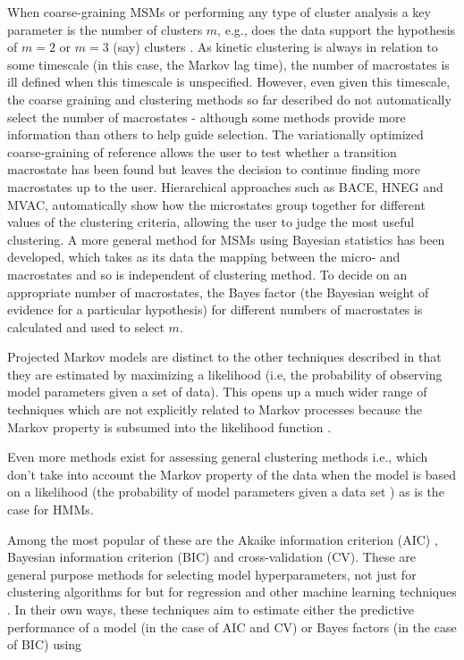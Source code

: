 \begin{highlighted}
When coarse-graining MSMs or performing any type of cluster analysis a key parameter is the number of clusters $m$, e.g., does the data support the hypothesis of $m=2$ or $m=3$ (say) clusters \cite{milliganExaminationProceduresDetermining1985}. As kinetic clustering is always in relation to some timescale (in this case, the Markov lag time), the number of macrostates is ill defined when this timescale is unspecified. However, even given this timescale, the coarse graining and clustering methods so far described do not automatically select the number of macrostates - although some methods provide more information than others to help guide selection. The variationally optimized coarse-graining of reference \cite{martiniVariationalIdentificationMarkovian2017} allows the user to test whether a transition macrostate has been found but leaves the decision to continue finding more macrostates up to the user. Hierarchical approaches such as BACE,  HNEG and MVAC, automatically show how the microstates group together for different values of the clustering criteria, allowing the user to judge the most useful clustering.  A more general method for MSMs using Bayesian statistics has been developed, which takes as its data the mapping between the micro- and macrostates \cite{bacalladoBayesianComparisonMarkov2009a} and so is independent of clustering method. To decide on an appropriate number of macrostates, the Bayes factor (the Bayesian weight of evidence for a particular hypothesis) \cite{kassBayesFactors1995} for different numbers of macrostates is calculated and used to select $m$. 


Projected Markov models are distinct to the other techniques described in that they are estimated by maximizing a likelihood \cite{wuProjectedMetastableMarkov2015, noeProjectedHiddenMarkov2013a} (i.e, the probability of observing model parameters given a set of data).  This opens up a much wider range of techniques which are not explicitly related to Markov processes because the Markov property is subsumed into the likelihood function \cite[chapter 7]{friedman2001elements}.  

Even more methods exist for assessing general clustering methods i.e., which don't take into account the Markov property of the data \cite{milliganExaminationProceduresDetermining1985, mclachlanFiniteMixtureModels2000} when the model is based on a likelihood (the probability of model parameters given a data set \cite[chapter 3]{8208528151144ef1805212918755aa1b}) as is the case for HMMs.  

Among the most popular of these are  the Akaike information criterion (AIC) \cite{akaikeInformationTheoryExtension1998},  Bayesian information criterion (BIC) \cite{schwarzEstimatingDimensionModel1978a} and cross-validation \cite{arlotSurveyCrossvalidationProcedures2009} (CV). These are general purpose methods for selecting model hyperparameters, not just for clustering algorithms for but for regression and other machine learning techniques \cite[chapter 6]{friedman2001elements}.  In their own ways, these techniques aim to estimate either the predictive performance of a model (in the case of AIC and CV) or Bayes factors (in the case of BIC) using 


\end{highlighted}
